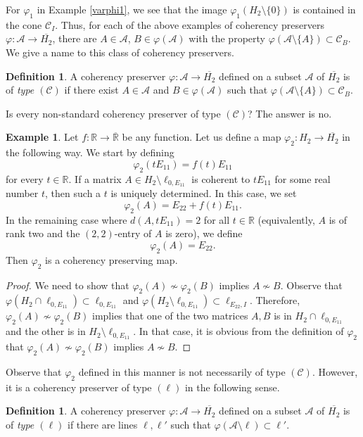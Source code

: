 \documentclass[10pt]{amsart}
\theoremstyle{definition}
\newtheorem{definition}[theorem]{Definition}
\newtheorem{example}[theorem]{Example}
\theoremstyle{remark}
\numberwithin{subsection}{section}
\numberwithin{equation}{section}
\newcommand\oH{{\overline{H_2}}}
\newcommand\oR{{\overline{\mathbb{R}}}}
\begin{document}
For $\varphi_1$ in Example \ref{varphi1}, we see that the image $\varphi_1(H_2\setminus \{0\})$ is contained in the cone $\mathcal{C}_I$. 
Thus, for each of the above examples of coherency preservers $\varphi\colon \mathcal{A}\to \oH$, there are $A\in \mathcal{A}$, $B\in \varphi(\mathcal{A})$ with the property $\varphi(\mathcal{A}\setminus \{A\})\subset \mathcal{C}_B$. 
We give a name to this class of coherency preservers.
\begin{definition}\label{degeneratefirst}
A coherency preserver $\varphi \colon \mathcal{A} \to \oH$ defined on a subset $\mathcal{A}$ of $\oH$ is of \emph{type $(\mathcal{C})$}  if there exist $A\in \mathcal{A}$ and $B \in \varphi(\mathcal{A})$  such that $\varphi (\mathcal{A}\setminus \{A\}) \subset \mathcal{C}_B$.
\end{definition}

Is every non-standard coherency preserver of type $(\mathcal{C})$? The answer is no. 


\begin{example}\label{varphi2}
Let $f\colon \mathbb{R} \to {\oR}$ be any function.
Let us define a map $\varphi_2 \colon H_2 \to \oH$ in the following way. 
We start by defining 
\[
\varphi_2 (tE_{11}) = f(t) E_{11}
\]
for every $t \in \mathbb{R}$. 
If a matrix $A\in H_2\setminus\ell_{0, E_{11}}$ is coherent to  $tE_{11}$ for some real number $t$, then such a $t$ is uniquely determined.
In this case, we set
\[
\varphi_2 (A) = E_ {22} + f(t) E_{11}.
\]
In the remaining case where $d(A, tE_{11}) = 2$ for all $t \in \mathbb{R}$ (equivalently, $A$ is of rank two and the $(2,2)$-entry of $A$ is zero), we define
\[
\varphi_2 (A) = E_{22}.
\]
Then $\varphi_2$ is a coherency preserving map.
\end{example}

\begin{proof}
We need to show that $\varphi_2 (A) \not\sim \varphi_2 (B)$ implies $A \not\sim B$. 
Observe that $\varphi(H_2\cap\ell_{0, E_{11}})\subset \ell_{0,E_{11}}$ and $\varphi(H_2\setminus\ell_{0, E_{11}})\subset \ell_{E_{22},I}$. 
Therefore, $\varphi_2 (A) \not\sim \varphi_2 (B)$ implies that one of the two matrices $A, B$ is in $H_2\cap\ell_{0, E_{11}}$ and the other is in $H_2\setminus\ell_{0, E_{11}}$. 
In that case, it is obvious from the definition of $\varphi_2$ that $\varphi_2 (A) \not\sim \varphi_2 (B)$ implies $A \not\sim B$.
\end{proof}

Observe that $\varphi_2$ defined in this manner is not necessarily of type $(\mathcal{C})$. 
However, it is a coherency preserver of type $(\ell)$ in the following sense.
\begin{definition}\label{degeneratesecond}
A coherency preserver $\varphi \colon \mathcal{A} \to \oH$ defined on a subset $\mathcal{A}$ of $\oH$ is of \emph{type $(\ell)$} 
if there are lines $\ell, \ell'$ such that $\varphi(\mathcal{A}\setminus \ell)\subset \ell'$.
\end{definition}
\end{document}
